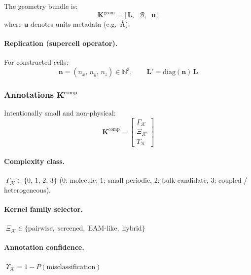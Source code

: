 \documentclass[11pt, a4paper, oneside]{article}
\theoremstyle{definition}
\theoremstyle{remark}
\newcommand{\N}{\mathbb{N}}
\newcommand{\boldK}{\mathbf{K}}
\newcommand{\boldL}{\mathbf{L}}
\begin{document}
\noindent The geometry bundle is:
\begin{equation}
  \boldK^{\mathrm{geom}} =
  \bigl[\,
    \boldL,\;\;
    \mathcal{B},\;\;
    \mathbf{u}
  \,\bigr]
  \label{eq:cell-geometry}
\end{equation}
where $\mathbf{u}$ denotes units metadata (e.g.\ \AA).

\paragraph{Replication (supercell operator).}

For constructed cells:
\begin{equation}
  \mathbf{n} = (n_x,\,n_y,\,n_z) \in \N^3,
  \qquad
  \boldL' = \mathrm{diag}(\mathbf{n})\,\boldL
  \label{eq:supercell}
\end{equation}

\subsubsection{Annotations \texorpdfstring{$\boldK^{\mathrm{comp}}$}{Kcomp}}
\label{sec:cell-comp}

Intentionally small and non-physical:
%
\begin{equation}
  \boldK^{\mathrm{comp}} =
  \begin{bmatrix}
    \Gamma_{\mathcal{K}} \\[3pt]
    \Xi_{\mathcal{K}} \\[3pt]
    \Upsilon_{\mathcal{K}}
  \end{bmatrix}
  \label{eq:cell-comp}
\end{equation}

\paragraph{Complexity class.}
$\;\Gamma_{\mathcal{K}} \in \{0,\,1,\,2,\,3\}$
\;(0: molecule, 1: small periodic, 2: bulk candidate,
   3: coupled / heterogeneous).

\paragraph{Kernel family selector.}
$\;\Xi_{\mathcal{K}} \in
  \{\text{pairwise},\;\text{screened},\;
   \text{EAM-like},\;\text{hybrid}\}$

\paragraph{Annotation confidence.}
$\;\Upsilon_{\mathcal{K}} = 1 - P(\text{misclassification})$
\end{document}
